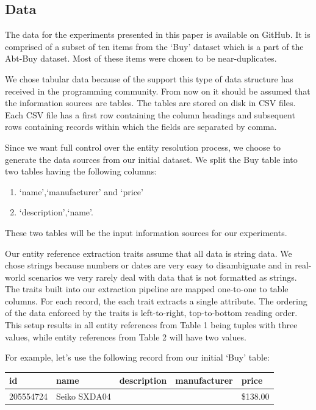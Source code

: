 \documentclass[11pt]{article}
\begin{document}
    \subsection{Data}

    The data for the experiments presented in this paper is available on
    GitHub\cite{expdata2023}.
    It is comprised of a subset of ten items from the `Buy' dataset which is a
    part of the Abt-Buy dataset\cite{vldb2010}.
    Most of these items were chosen to be near-duplicates.
    
    We chose tabular data because of the support this type of data structure has
    received in the programming community\cite{pandas2010,pandas2023}.
    From now on it should be assumed that the information sources are tables.
    The tables are stored on disk in CSV files.
    Each CSV file has a first row containing the column headings and subsequent
    rows containing records within which the fields are separated by comma.
    
    Since we want full control over the entity resolution process, we choose to
    generate the data sources from our initial dataset.
    We split the Buy table into two tables having the following columns:
    \begin{enumerate}[label=\textbullet~Table~\arabic*:,leftmargin=*]
        \item `name',`manufacturer' and `price'
        \item `description',`name'.
    \end{enumerate}
    These two tables will be the input information sources for our experiments.

    Our entity reference extraction traits assume that all data is string data.
    We chose strings because numbers or dates are very easy to disambiguate and
    in real-world scenarios we very rarely deal with data that is not formatted
    as strings.
    The traits built into our extraction pipeline are mapped one-to-one to table
    columns.
    For each record, the each trait extracts a single attribute.
    The ordering of the data enforced by the traits is left-to-right,
    top-to-bottom reading order.
    This setup results in all entity references from Table 1 being tuples with
    three values, while entity references from Table 2 will have two values.

    For example, let's use the following record from our initial `Buy' table:
    \begin{center}
        \begin{tabular}[b]{|l|l|l|l|l|}
            \hline
            id&name&description&manufacturer&price\\
            \hline
            205554724&Seiko SXDA04& & &\$138.00\\
            \hline
        \end{tabular}
    \end{center}
\end{document}
